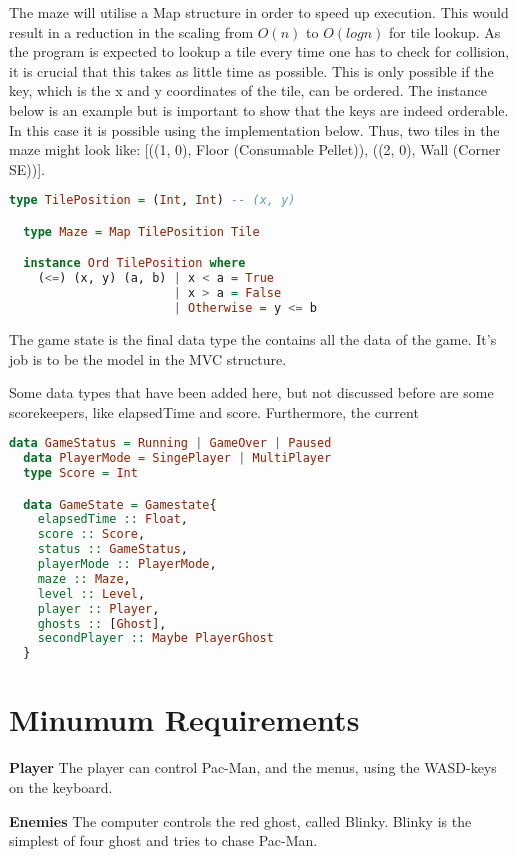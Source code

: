 \documentclass[11pt]{Article}
\begin{document}
The maze will utilise a Map structure in order to speed up execution. This would result in a reduction in the scaling from $O(n)$ to $O(logn)$ for tile lookup. As the program is expected to lookup a tile every time one has to check for collision, it is crucial that this takes as little time as possible. This is only possible if the key, which is the x and y coordinates of the tile, can be ordered. The instance below is an example but is important to show that the keys are indeed orderable. In this case it is possible using the implementation below. Thus, two tiles in the maze might look like: [((1, 0), Floor (Consumable Pellet)), ((2, 0), Wall (Corner SE))]. 

\begin{lstlisting}[language=Haskell]
  type TilePosition = (Int, Int) -- (x, y)

  type Maze = Map TilePosition Tile

  instance Ord TilePosition where 
    (<=) (x, y) (a, b) | x < a = True 
                       | x > a = False
                       | Otherwise = y <= b

\end{lstlisting}

\newpage
The game state is the final data type the contains all the data of the game. It's job is to be the model in the MVC structure. 

Some data types that have been added here, but not discussed before are some scorekeepers, like elapsedTime and score. Furthermore, the current
\begin{lstlisting}[language=Haskell]
  data GameStatus = Running | GameOver | Paused
  data PlayerMode = SingePlayer | MultiPlayer
  type Score = Int

  data GameState = Gamestate{
    elapsedTime :: Float,
    score :: Score,
    status :: GameStatus,
    playerMode :: PlayerMode,
    maze :: Maze, 
    level :: Level,
    player :: Player,
    ghosts :: [Ghost],
    secondPlayer :: Maybe PlayerGhost
  }
\end{lstlisting}


\section{Minumum Requirements} \label{ch:minumumRequirements}

\textbf{Player} The player can control Pac-Man, and the menus, using the WASD-keys on the keyboard.

\textbf{Enemies} The computer controls the red ghost, called Blinky. Blinky is the simplest of four ghost and tries to chase Pac-Man.
\end{document}
